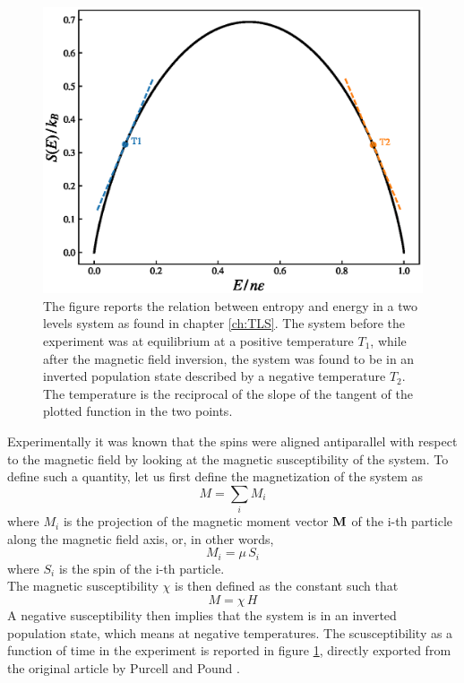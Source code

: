 \begin{figure}[h]
    \centering 
    \includegraphics[scale=0.6]{./images/PandP_states.eps}
    \caption{The figure reports the relation between entropy and energy in a two levels system as found in chapter \ref{ch:TLS}. The system before the experiment was at equilibrium at a positive temperature $T_1$, while after the magnetic field inversion, the system 
    was found to be in an inverted population state described by a negative temperature $T_2$. The temperature is the reciprocal of the slope of the tangent of the plotted function in the two points.}
    \label{fig:PandP_switch}
\end{figure}
Experimentally it was known that the spins were aligned antiparallel with respect to the magnetic field by looking at the magnetic susceptibility of the system. To define such a quantity, let us first define the magnetization of the system as
\begin{equation}
    M = \sum_i M_i
\end{equation}
where $M_i$ is the projection of the magnetic moment vector $\mathbf{M}$ of the i-th particle along the magnetic field axis, or, in other words,
\begin{equation*}
    M_i = \mu \, S_i
\end{equation*}
where $S_i$ is the spin of the i-th particle. \\
The magnetic susceptibility $\chi$ is then defined as the constant such that
\begin{equation*}
    M = \chi \, H
\end{equation*}
A negative susceptibility then implies that the system is in an inverted population state, which means at negative temperatures. The scusceptibility as a function of time in the experiment is reported in figure \ref{fig:PandP_switch}, directly exported from the original article by Purcell and Pound \cite{PandP}.
